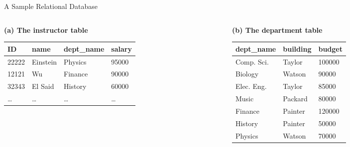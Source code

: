 \documentclass[aspectratio=169, xcolor=dvipsnames]{beamer}
\begin{document}
\begin{frame}{A Sample Relational Database}
    \begin{columns}
        \begin{column}{0.5\textwidth}
            \textbf{(a) The instructor table}
            \begin{center}
                \begin{adjustbox}{max width=\textwidth}
                \begin{tabular}{|l|l|l|l|}
                \hline
                \textbf{ID} & \textbf{name} & \textbf{dept\_name} & \textbf{salary} \\ \hline
                22222 & Einstein & Physics & 95000 \\ \hline
                12121 & Wu & Finance & 90000 \\ \hline
                32343 & El Said & History & 60000 \\ \hline
                \dots & \dots & \dots & \dots \\ \hline
                \end{tabular}
                \end{adjustbox}
            \end{center}
        \end{column}
        \begin{column}{0.5\textwidth}
            \textbf{(b) The department table}
            \begin{center}
                \begin{adjustbox}{max width=\textwidth}
                \begin{tabular}{|l|l|l|}
                \hline
                \textbf{dept\_name} & \textbf{building} & \textbf{budget} \\ \hline
                Comp. Sci. & Taylor & 100000 \\ \hline
                Biology & Watson & 90000 \\ \hline
                Elec. Eng. & Taylor & 85000 \\ \hline
                Music & Packard & 80000 \\ \hline
                Finance & Painter & 120000 \\ \hline
                History & Painter & 50000 \\ \hline
                Physics & Watson & 70000 \\ \hline
                \end{tabular}
                \end{adjustbox}
            \end{center}
        \end{column}
    \end{columns}
\end{frame}
\end{document}
